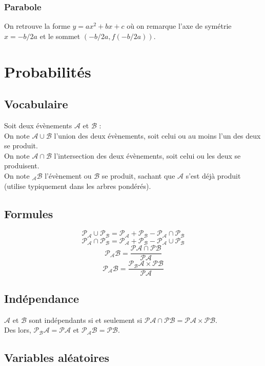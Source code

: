 \documentclass{article}
\begin{document}
\subsubsection{Parabole}
    On retrouve la forme $y=ax^2+bx+c$ où on remarque l'axe de symétrie $x = -b/2a$ et le sommet $(-b/2a,f(-b/2a))$.



\section{Probabilités}


\subsection{Vocabulaire}
    Soit deux évènements $\mathcal{A}$ et $\mathcal{B}$ :\\
    On note $\mathcal{A} \cup \mathcal{B}$ l'union des deux évènements, soit celui ou au moins l'un des deux se produit.\\
    On note $\mathcal{A} \cap \mathcal{B}$ l'intersection des deux évènements, soit celui ou les deux se produisent.\\
    On note $\mathcal{_AB}$ l'évènement ou $\mathcal{B}$ se produit, sachant que $\mathcal{A}$ s'est déjà produit (utilise typiquement dans les arbres pondérés).\\


\subsection{Formules}
    $$\mathcal{P_A} \cup \mathcal{P_B} = \mathcal{P_A} +\mathcal{P_B} - \mathcal{P_A} \cap \mathcal{P_B}$$
    $$\mathcal{P_A} \cap \mathcal{P_B} = \mathcal{P_A} +\mathcal{P_B} - \mathcal{P_A} \cup \mathcal{P_B}$$
    $$\mathcal{P_AB} = \frac{\mathcal{PA} \cap \mathcal{PB}}{\mathcal{PA}}$$
    $$\mathcal{P_AB} = \frac{\mathcal{P_BA} \times \mathcal{PB}}{\mathcal{PA}}$$


\subsection{Indépendance}
    $\mathcal{A}$ et $\mathcal{B}$ sont indépendants si et seulement si $\mathcal{PA} \cap \mathcal{PB} = \mathcal{PA} \times \mathcal{PB}$. \\
    Des lors, $\mathcal{P_BA} = \mathcal{PA}$ et $\mathcal{P_AB} = \mathcal{PB}$.


\subsection{Variables aléatoires}
\end{document}
